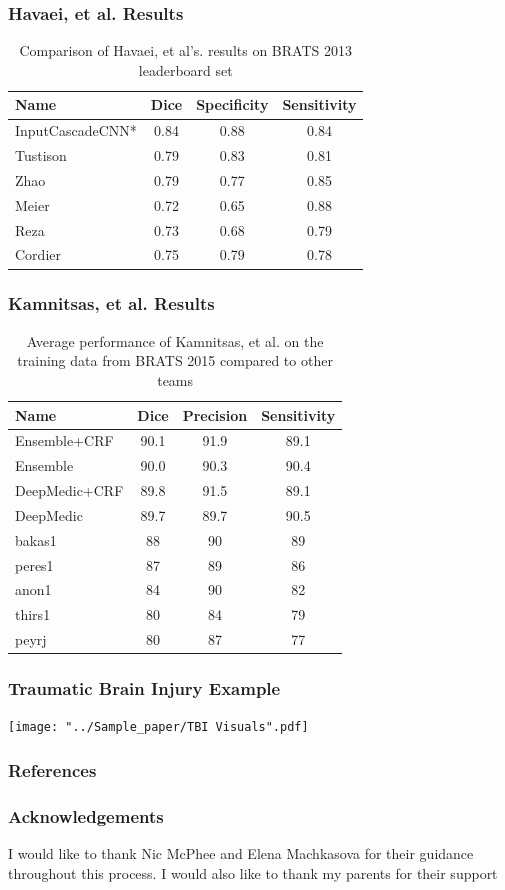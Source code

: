 \documentclass{beamer}
\begin{document}
\begin{frame} 
	\frametitle{Havaei, et al. Results}
	\begin{table}
	\begin{tabular}{l | c | c | c }
	Name & Dice & Specificity & Sensitivity\\
	\hline
	InputCascadeCNN* & 0.84 & 0.88 & 0.84\\
	Tustison & 0.79 & 0.83 & 0.81\\
	Zhao & 0.79 & 0.77 & 0.85\\
	Meier & 0.72 & 0.65 & 0.88\\
	Reza & 0.73 & 0.68 & 0.79\\
	Cordier & 0.75 & 0.79 & 0.78
	\end{tabular}
	\caption{Comparison of Havaei, et al's. results on BRATS 2013 leaderboard set}
	\end{table}
\end{frame}

\begin{frame} 
	\frametitle{Kamnitsas, et al. Results}
	\begin{table}
	\begin{tabular}{l | c | c | c }
	Name & Dice & Precision & Sensitivity\\
	\hline
	Ensemble+CRF & 90.1 & 91.9 & 89.1\\
	Ensemble & 90.0 & 90.3 & 90.4\\
	DeepMedic+CRF & 89.8 & 91.5 & 89.1\\
	DeepMedic & 89.7 & 89.7 & 90.5\\
	bakas1 & 88 & 90 & 89\\
	peres1 & 87 & 89 & 86\\
	anon1 & 84 & 90 & 82\\
	thirs1 & 80 & 84 & 79\\
	peyrj & 80 & 87 & 77
	\end{tabular}
	\caption{Average performance of Kamnitsas, et al. on the training data from BRATS 2015 compared to other teams}
	\end{table}
\end{frame}

\begin{frame} 
	\frametitle{Traumatic Brain Injury Example}
    \texttt{[image: "../Sample\_paper/TBI Visuals".pdf]}
    \\
\end{frame}

\begin{frame} 
	\frametitle{References}
	
	
\end{frame}

\begin{frame}
	\frametitle{Acknowledgements}
	I would like to thank Nic McPhee and Elena Machkasova for their guidance throughout this process. I would also like to thank my parents for their support
\end{frame}
\end{document}
